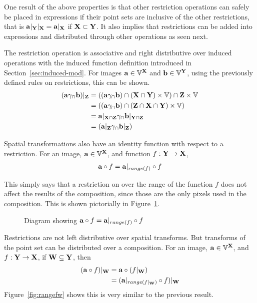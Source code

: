 \documentclass{ucdthesis}       %
\begin{document}
One result of the above properties is that other restriction
operations can safely be placed in expressions if their point sets are
inclusive of the other restrictions, that is
${\bf{a}}|_{\bf{Y}}|_{\bf{X}}={\bf{a}}|_{\bf{X}}$ if ${\bf{X}}\subset {\ensuremath{\bf{Y}}}$.  It
also implies that restrictions can be added into expressions and
distributed through other operations as seen next.

The restriction operation is associative and right distributive over
induced operations with the induced function definition introduced in
Section~\ref{sec:induced-mod}.  For images ${\bf{a}} \in {\ensuremath{\mathbb{V}}}^{{\bf{X}}}$
and ${\bf{b}} \in {\ensuremath{\mathbb{V}}}^{{\bf{Y}}}$, using the previously defined rules on
restrictions, this can be shown.
\begin{align*}
  ({\bf{a}} \gamma_\cap {\ensuremath{\bf{b}}})|_{\bf{Z}} &=(({\bf{a}} \gamma_\cap {\ensuremath{\bf{b}}}) \cap ({\bf{X}} \cap {\ensuremath{\bf{Y}}}) \times {\ensuremath{\mathbb{V}}}) \cap {\ensuremath{\bf{Z}}} \times {\ensuremath{\mathbb{V}}} \\
  &=(({\bf{a}} \gamma_\cap {\ensuremath{\bf{b}}}) \cap ({\bf{Z}} \cap {\ensuremath{\bf{X}}} \cap {\ensuremath{\bf{Y}}}) \times {\ensuremath{\mathbb{V}}}) \\
  &={\bf{a}}|_{{\bf{X}}\cap{\ensuremath{\bf{Z}}}} \gamma_\cap {\ensuremath{\bf{b}}}|_{{\bf{Y}}\cap{\ensuremath{\bf{Z}}}} \\
  &=({\bf{a}}|_{\bf{Z}} \gamma_\cap {\ensuremath{\bf{b}}}|_{\bf{Z}})
\end{align*}

Spatial transformations also have an identity function with respect to
a restriction.  For an image, ${\bf{a}} \in {\ensuremath{\mathbb{V}}}^{{\bf{X}}}$, and function
$f: {\bf{Y}} \rightarrow {\ensuremath{\bf{X}}}$, \[ {\bf{a}} \circ f = {\bf{a}}|_{range(f)} \circ f\]

This simply says that a restriction on  over the range of the
function $f$ does not affect the results of the composition, since
those are the only pixels used in the composition.  This is shown
pictorially in Figure~\ref{fig:rangef}.

\begin{figure}[htb]
  \centering
  \scalebox{0.8}{}
  \caption{Diagram showing ${\bf{a}} \circ f = {\bf{a}}|_{range(f)} \circ f$}
  \label{fig:rangef}
\end{figure}

Restrictions are not left distributive over spatial transforms.  But
transforms of the point set can be distributed over a composition.
For an image, ${\bf{a}} \in {\ensuremath{\mathbb{V}}}^{{\bf{X}}}$, and $f: {\bf{Y}} \rightarrow
{\ensuremath{\bf{X}}}$, if ${\bf{W}} \subseteq {\ensuremath{\bf{Y}}}$, then
\begin{align*}
  ({\bf{a}} \circ f)|_{{\bf{W}}} &= {\bf{a}} \circ (f|_{\bf{W}}) \\ 
  &= ({\bf{a}}|_{range(f|_{{\bf{W}}})} \circ f)|_{\bf{W}}
\end{align*}
%
Figure~\ref{fig:rangefw} shows this is very similar to the previous
result.
\end{document}
